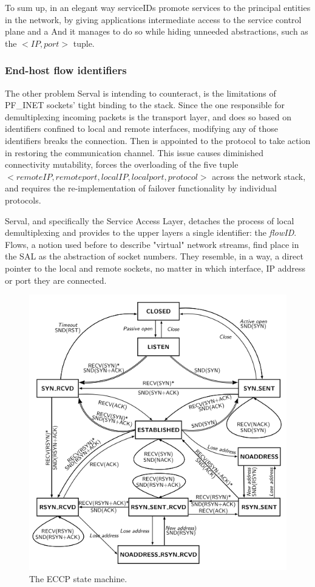 To sum up, in an elegant way serviceIDs promote services to the principal entities in the network, by giving applications intermediate access to the service control plane and a
And it manages to do so while hiding unneeded abstractions, such as the $<IP, port>$ tuple.



\subsubsection{End-host flow identifiers}
The other problem Serval is intending to counteract, is the limitations of PF\_INET sockets' tight binding to the stack.
Since the one responsible for demultiplexing incoming packets is the transport layer, and does so based on identifiers confined to local and remote interfaces, modifying any of those identifiers breaks the connection.
Then is appointed to the protocol to take action in restoring the communication channel.
This issue causes diminished connectivity mutability, forces the overloading of the five tuple $<remote IP, remote port, local IP, local port, protocol>$ across the network stack, and requires the re-implementation of failover functionality by individual protocols.

Serval, and specifically the Service Access Layer, detaches the process of local demultiplexing and provides to the upper layers a single identifier: the \emph{flowID}.
Flows, a notion used before to describe "virtual" network streams, find place in the SAL as the abstraction of socket numbers.
They resemble, in a way, a direct pointer to the local and remote sockets, no matter in which interface, IP address or port they are connected.

\begin{figure}
\centering
{}
\includegraphics[scale=0.6]{figures/ECCP_sm}
\caption[The ECCP state machine]{The ECCP \cite{Arye2012} state machine.}
\label{fig:EECP_sm}
\end{figure}

